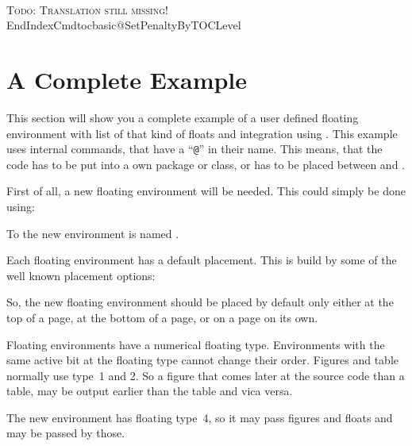 \begin{Declaration}
  \\
\end{Declaration}
%
%
\textsc{Todo: Translation still missing!}
EndIndex{Cmd}{tocbasic@SetPenaltyByTOCLevel}%
%


\section{A Complete Example}

This section will show you a complete example of a user defined floating
environment with list of that kind of floats and \KOMAScript{} integration
using . This example uses internal commands, that have a
``\texttt{@}'' in their name. This means, that the code
has to be put into a own package or class, or has to be placed between
%
 and .

First of all, a new floating environment will be
needed. This could simply be done using:
\begin{lstcode}[belowskip=\dp\strutbox plus 1pt]
  \newenvironment{remarkbox}{%
    \@float{remarkbox}%
  }{%
    \end@float
  }
\end{lstcode}
To the new environment is named .

Each floating environment has a default
placement. This is build by some of the well known placement options:
\begin{lstcode}[belowskip=\dp\strutbox plus 1pt]
  \newcommand*{\fps@remarkbox}{tbp}
\end{lstcode}
So, the new floating environment should be placed by default only either at
the top of a page, at the bottom of a page, or on a page on its own.

Floating environments have a numerical floating
type. Environments with the same active bit at the floating type cannot change
their order. Figures and table normally use type~1 and 2. So a figure that
comes later at the source code than a table, may be output earlier than the
table and vica versa.
\begin{lstcode}[belowskip=\dp\strutbox plus 1pt]
  \newcommand*{\ftype@remarkbox}{4}
\end{lstcode}
The new environment has floating type~4, so it may pass figures and floats and
may be passed by those.

